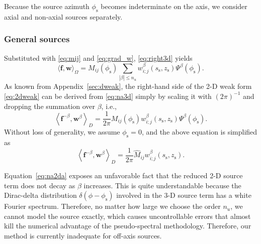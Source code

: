 \documentclass[extra,referee]{gji}
\begin{document}
Because the source azimuth $\phi_\text{s}$ becomes indeterminate on the axis, 
we consider axial and non-axial sources separately. 

\subsubsection{General sources}  
\label{sec:offaxis}
Substituted with \eqref{eq:mij} and \eqref{eq:grad_w}, 
\eqref{eq:right3d} yields 
\begin{equation}
  \langle \mathbf{f},\mathbf{w}\rangle_{\Omega}=
  M_{ij}\left(\phi_\text{s}\right)
  \sum_{|\beta|\le n_u} w_{i;j}^\beta\left(s_\text{s},z_\text{s}\right) 
  \Psi^\beta\left(\phi_\text{s}\right).
  \label{eq:na3d}
\end{equation}
As known from Appendix~\ref{sec:dweak}, the right-hand side of the 2-D weak 
form \eqref{eq:2dweak} can be derived from \eqref{eq:na3d} simply by 
scaling it with $\left(2\pi\right)^{-1}$ and dropping the summation over $\beta$, i.e., 
\begin{equation}
  \left\langle \mathbf{f}^{-\beta},\mathbf{w}^\beta \right\rangle _{D}=
  \frac{1}{2\pi}
  M_{ij}\left(\phi_\text{s}\right)
  w_{i;j}^\beta\left(s_\text{s},z_\text{s}\right) \Psi^\beta\left(\phi_\text{s}\right).
  \label{eq:na2d} 
\end{equation}
Without loss of generality, we assume $\phi_\text{s}=0$, and the above 
equation is simplified as
\begin{equation}
  \left\langle \mathbf{f}^{-\beta},\mathbf{w}^\beta \right\rangle _{D}=
  \frac{1}{2\pi}
  \hat{M}_{ij} w_{i;j}^\beta\left(s_\text{s},z_\text{s}\right). 
  \label{eq:na2da} 
\end{equation}

Equation~\eqref{eq:na2da} exposes an unfavorable fact that 
the reduced 2-D source term does not decay as $\beta$ increases. 
This is quite understandable because
the Dirac-delta distribution $\delta\left(\phi-\phi_\text{s}\right)$ involved in 
the 3-D source term has a white Fourier spectrum.
Therefore, no matter how large we choose the order $n_u$, we cannot 
model the source exactly, which causes uncontrollable errors that 
almost kill the numerical advantage of the pseudo-spectral methodology. 
Therefore, our method is currently inadequate for off-axis sources.
\end{document}
